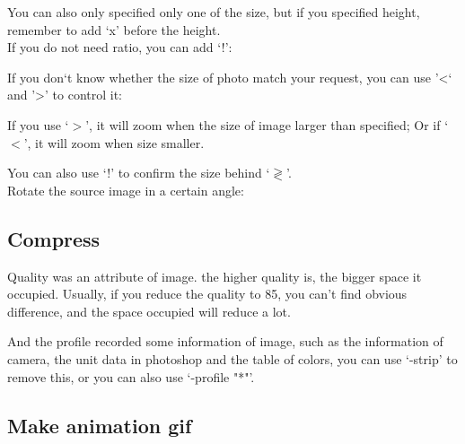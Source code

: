 \documentclass[12pt]{article}
\begin{document}
You can also only specified only one of the size, but if you specified height, remember to add `x' before the height.\\

If you do not need ratio, you can add `!':\vspace{5mm}

{\centering{}\par} \vspace{5mm}

If you don`t know whether the size of photo match your request, you can use '\textless` and '\textgreater' to control it:\vspace{5mm}

{\centering{}\par}\vspace{5mm}

If you use `$>$', it will zoom when the size of image larger than specified; Or if `$<$', it will zoom when size smaller.

You can also use `!' to confirm the size behind `$\gtrless$'.\\

Rotate the source image in a certain angle:\vspace{5mm}

{\centering{}\par}

\subsection{Compress}
{\centering{}\par}\vspace{5mm}

Quality was an attribute of image. the higher quality is, the bigger space it occupied. Usually, if you reduce the quality to 85, you can't find obvious difference, and the space occupied will reduce a lot.

And the profile recorded some information of image, such as the information of camera, the unit data in photoshop and the table of colors, you can use `-strip' to remove this, or you can also use `-profile "*"'.

\subsection{Make animation gif}
{\centering{}\par}\vspace{5mm}
\end{document}
